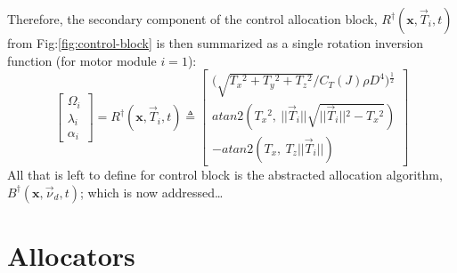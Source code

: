 Therefore, the secondary component of the control allocation block, $R^\dagger(\mathbf{x},\vec{T}_i,t)$ from Fig:\ref{fig:control-block} is then summarized as a single rotation inversion function (for motor module $i=1$):
\begin{equation}\label{eq:allocator-inersion}
\begin{bmatrix}
\Omega_i\\
\lambda_i\\
\alpha_i
\end{bmatrix}
=
R^\dagger(\mathbf{x},\vec{T}_i,t)\triangleq
\begin{bmatrix}
\Big(\sqrt{T_x\text{}^2+T_y\text{}^2+T_z\text{}^2}/C_T(J)\rho D^4\Big)\text{}^{\frac{1}{2}}\\
atan2(T_x\text{}^2,~||\vec{T}_i||\sqrt{||\vec{T}_i||\text{}^2-T_x\text{}^2})\\
-atan2(T_x,~T_z||\vec{T}_i||)
\end{bmatrix}
\end{equation}
All that is left to define for control block is the abstracted allocation algorithm, $B^\dagger(\mathbf{x},\vec{\nu}_d,t)$; which is now addressed\ldots
\section{Allocators}
\label{sec:allocation.allocators}
